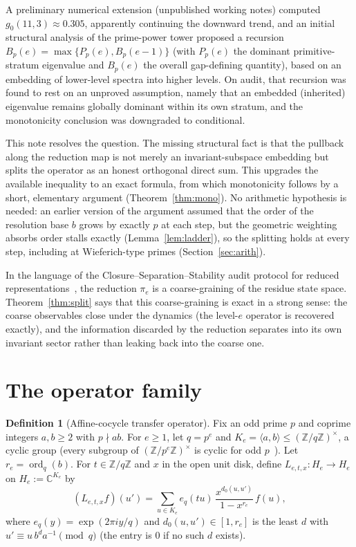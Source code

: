 \documentclass[11pt]{article}
\theoremstyle{definition}
\newtheorem{definition}[theorem]{Definition}
\theoremstyle{remark}
\newcommand{\Z}{\mathbb{Z}}
\newcommand{\C}{\mathbb{C}}
\newcommand{\ord}{\operatorname{ord}}
\begin{document}
A preliminary numerical extension (unpublished working notes) computed $g_0(11,3)\approx0.305$, apparently continuing the downward trend, and an initial structural analysis of the prime-power tower proposed a recursion $B_p(e)=\max\{P_p(e),B_p(e-1)\}$ (with $P_p(e)$ the dominant primitive-stratum eigenvalue and $B_p(e)$ the overall gap-defining quantity), based on an embedding of lower-level spectra into higher levels. On audit, that recursion was found to rest on an unproved assumption, namely that an embedded (inherited) eigenvalue remains globally dominant within its own stratum, and the monotonicity conclusion was downgraded to conditional.

This note resolves the question. The missing structural fact is that the pullback along the reduction map is not merely an invariant-subspace embedding but splits the operator as an honest orthogonal direct sum. This upgrades the available inequality to an exact formula, from which monotonicity follows by a short, elementary argument (Theorem~\ref{thm:mono}). No arithmetic hypothesis is needed: an earlier version of the argument assumed that the order of the resolution base $b$ grows by exactly $p$ at each step, but the geometric weighting absorbs order stalls exactly (Lemma~\ref{lem:ladder}), so the splitting holds at every step, including at Wieferich-type primes (Section~\ref{sec:arith}).

In the language of the Closure--Separation--Stability audit protocol for reduced representations~\cite{DJ-css}, the reduction $\pi_e$ is a coarse-graining of the residue state space. Theorem~\ref{thm:split} says that this coarse-graining is exact in a strong sense: the coarse observables close under the dynamics (the level-$e$ operator is recovered exactly), and the information discarded by the reduction separates into its own invariant sector rather than leaking back into the coarse one.

\section{The operator family}

\begin{definition}[Affine-cocycle transfer operator]\label{def:op}
Fix an odd prime $p$ and coprime integers $a,b\ge2$ with $p\nmid ab$. For $e\ge1$, let $q=p^e$ and $K_e=\langle a,b\rangle\le(\Z/q\Z)^\times$, a cyclic group (every subgroup of $(\Z/p^e\Z)^\times$ is cyclic for odd $p$~\cite{IrelandRosen}). Let $r_e=\ord_q(b)$. For $t\in\Z/q\Z$ and $x$ in the open unit disk, define $L_{e,t,x}:H_e\to H_e$ on $H_e:=\C^{K_e}$ by
\[
(L_{e,t,x}f)(u')=\sum_{u\in K_e} e_q(tu)\,\frac{x^{d_0(u,u')}}{1-x^{r_e}}\,f(u),
\]
where $e_q(y)=\exp(2\pi i y/q)$ and $d_0(u,u')\in[1,r_e]$ is the least $d$ with $u'\equiv u\,b^d a^{-1}\pmod q$ (the entry is $0$ if no such $d$ exists).
\end{definition}
\end{document}
